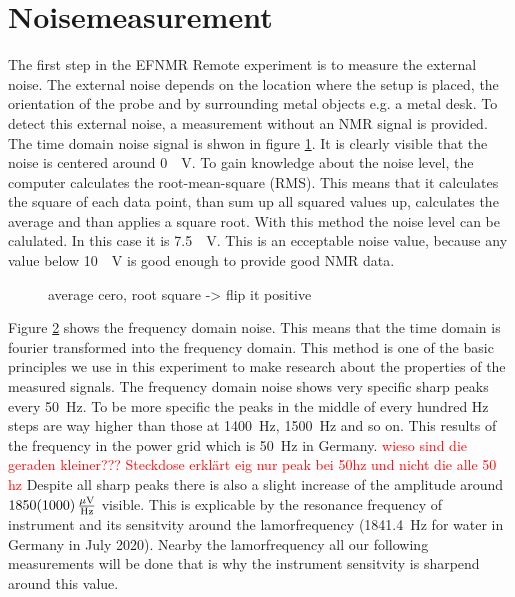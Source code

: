\section{Noisemeasurement}
The first step in the EFNMR Remote experiment is to measure the external noise. The external noise depends on the location where the setup is placed, the orientation of the probe and by surrounding metal objects e.g. a metal desk. To detect this external noise, a measurement without an NMR signal is provided. The time domain noise signal is shwon in figure \ref{fig: noise}. It is clearly visible that the noise is centered around \SI{0}{\mu \volt}. To gain knowledge about the noise level, the computer calculates the root-mean-square (RMS). This means that it calculates the square of each data point, than sum up all squared values up, calculates the average and than applies a square root. With this method the noise level can be calulated. In this case it is \SI{7.5}{\mu \volt}. This is an ecceptable noise value, because any value below \SI{10}{\mu \volt} is good enough to provide good NMR data.

\begin{figure}[H]
    \centering
    
    \caption[]{average cero, root square -> flip it positive}
    \label{fig: noise}
\end{figure}

Figure \ref{fig: MonitorNoise138} shows the frequency domain noise. This means that the time domain is fourier transformed into the frequency domain. This method is one of the basic principles we use in this experiment to make research about the properties of the measured signals. The frequency domain noise shows very specific sharp peaks every \SI{50}{\hertz}. To be more specific the peaks in the middle of every hundred \si{\hertz} steps are way higher than those at \SI{1400}{\hertz}, \SI{1500}{\hertz} and so on. This results of the frequency in the power grid which is \SI{50}{\hertz} in Germany.
\textcolor{red}{wieso sind die geraden kleiner??? Steckdose erklärt eig nur peak bei 50hz und nicht die alle 50 hz}
Despite all sharp peaks there is also a slight increase of the amplitude around $\SI{1850 \pm 1000}{\frac{\mu \volt}{\hertz}}$ visible. This is explicable by the resonance frequency of instrument and its sensitvity around the lamorfrequency (\SI{1841.4}{\hertz} for water in Germany in July 2020). Nearby the lamorfrequency all our following measurements will be done that is why the instrument sensitvity is sharpend around this value.

\begin{figure}[H]
    \centering
    
    \caption[]{}
    \label{fig: MonitorNoise138}
\end{figure}

